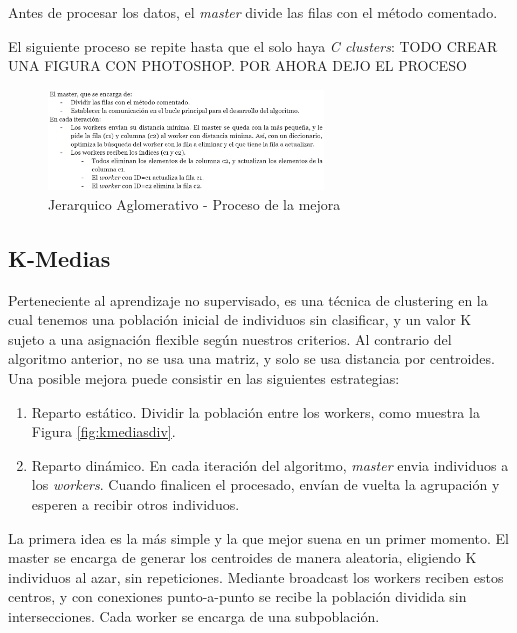 		Antes de procesar los datos, el \textit{master} divide las filas con el método comentado. 
		
		El siguiente proceso se repite hasta que el solo haya \textit{C clusters}: \color{blue} TODO CREAR UNA FIGURA CON PHOTOSHOP. POR AHORA DEJO EL PROCESO \color{black}
		
		\begin{figure}[!h]
			\centering
			\includegraphics[width=0.65\textwidth]{images/chapter_3/aglomerativo_sec}
			
			
			\caption{Jerarquico Aglomerativo - Proceso de la mejora}
			\label{fig:JA}
		\end{figure}
		
		
		
		
	\subsection{K-Medias}
	\label{cap:3_2_2}
		Perteneciente al aprendizaje no supervisado, es una técnica de clustering en la cual tenemos una población inicial de individuos sin clasificar, y un valor K sujeto a una asignación flexible según nuestros criterios. Al contrario del algoritmo anterior, no se usa una matriz, y solo se usa distancia por centroides. Una posible mejora puede consistir en las siguientes estrategias:
		
		
		
		\begin{enumerate}
			\item Reparto estático. Dividir la población entre los workers, como muestra la Figura \ref{fig:kmediasdiv}. 
			\item Reparto dinámico. En cada iteración del algoritmo, \textit{master} envia individuos a los \textit{workers}. Cuando finalicen el procesado, envían de vuelta la agrupación y esperen a recibir otros individuos. 
		\end{enumerate}
		
		La primera idea es la más simple y la que mejor suena en un primer momento. El master se encarga de generar los centroides de manera aleatoria, eligiendo K individuos al azar, sin repeticiones. Mediante broadcast los workers reciben estos centros, y con conexiones punto-a-punto se recibe la población dividida sin intersecciones. Cada worker se encarga de una subpoblación. 
		
